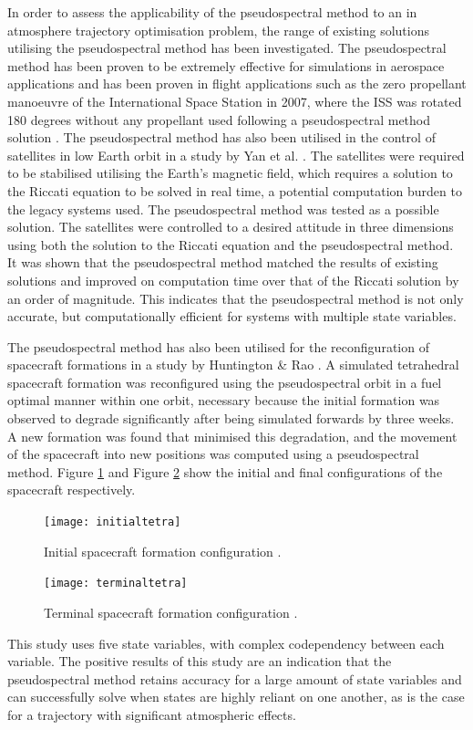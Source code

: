 In order to assess the applicability of the pseudospectral method to an in atmosphere trajectory optimisation problem, the range of existing solutions utilising the pseudospectral method has been investigated. 
The pseudospectral method has been proven to be extremely effective for simulations in aerospace applications and has been proven in flight applications such as the zero propellant manoeuvre of the International Space Station in 2007, where the ISS was rotated 180 degrees without any propellant used following a pseudospectral method solution \cite{Bedrossian}. 
The pseudospectral method has also been utilised in the control of satellites in low Earth orbit in a study by Yan et al. \cite{Yan2007}. The satellites were required to be stabilised utilising the Earth's magnetic field, which requires a solution to the Riccati equation to be solved in real time, a potential computation burden to the legacy systems used. The pseudospectral method was tested as a possible solution. The satellites were controlled to a desired attitude in three dimensions using both the solution to the Riccati equation and the pseudospectral method. It was shown that the pseudospectral method matched the results of existing solutions and improved on computation time over that of the Riccati solution by an order of magnitude. This indicates that the pseudospectral method is not only accurate, but computationally efficient for systems with multiple state variables. 

The pseudospectral method has also been utilised for the reconfiguration of spacecraft formations in a study by Huntington \& Rao \cite{Huntington2008}. A simulated tetrahedral spacecraft formation was reconfigured using the pseudospectral orbit in a fuel optimal manner within one orbit, necessary because the initial formation was observed to degrade significantly after being simulated forwards by three weeks. A new formation was found that minimised this degradation, and the movement of the spacecraft into new positions was computed using a pseudospectral method. Figure \ref{fig:initialtetra} and Figure \ref{fig:terminaltetra} show the initial and final configurations of the spacecraft respectively. 
\begin{figure}[ht] 
	\centering
	\texttt{[image: initialtetra]}
	\caption{Initial spacecraft formation configuration \cite{Huntington2008}.}
	\label{fig:initialtetra}
\end{figure}
\begin{figure}[ht]
	\centering
	\texttt{[image: terminaltetra]}
	\caption[Hello World]{Terminal spacecraft formation configuration \cite{Huntington2008}.}
	\label{fig:terminaltetra}
\end{figure}
This study uses five state variables, with complex codependency between each variable. The positive results of this study are an indication that the pseudospectral method retains accuracy for a large amount of state variables and can successfully solve when states are highly reliant on one another, as is the case for a trajectory with significant atmospheric effects. 


